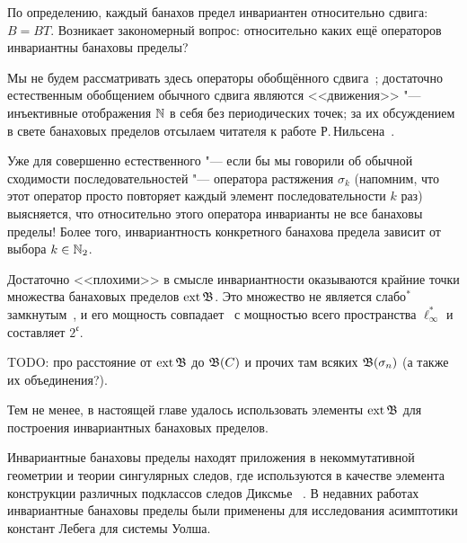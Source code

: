 По определению, каждый банахов предел инвариантен относительно сдвига: $B=BT$.
Возникает закономерный вопрос: относительно каких ещё операторов инвариантны банаховы пределы?

Мы не будем рассматривать здесь операторы обобщённого сдвига~\cite{marchenko2006generalized,lewitan1945normed};
достаточно естественным обобщением обычного сдвига являются <<движения>> "--- инъективные отображения $\mathbb{N}$ в себя без периодических точек; за их обсуждением в свете банаховых пределов отсылаем читателя к работе Р.\,Нильсена~\cite{Nillsen}.

Уже для совершенно естественного "--- если бы мы говорили об обычной сходимости последовательностей "---
оператора растяжения $\sigma_k$
(напомним, что этот оператор просто повторяет каждый элемент последовательности $k$ раз)
выясняется, что относительно этого оператора инварианты не все банаховы пределы!
Более того, инвариантность конкретного банахова предела зависит от выбора $k\in\mathbb{N}_2$.




Достаточно <<плохими>> в смысле инвариантности оказываются крайние точки множества банаховых пределов $\operatorname{ext} \mathfrak{B}$.
Это множество не является слабо$^*$ замкнутым~\cite{Nillsen,Talagrand},
и его мощность совпадает~\cite{Chou} с мощностью всего пространства $\ell_\infty^*$
и составляет $2^{\mathfrak c}$.

TODO: про расстояние от $\operatorname{ext} \mathfrak{B}$ до $\mathfrak{B}(C)$ и прочих там всяких $\mathfrak{B}(\sigma_n)$ (а также их объединения?).

Тем не менее, в настоящей главе удалось использовать элементы $\operatorname{ext}\mathfrak{B}$ для построения инвариантных банаховых пределов.


Инвариантные банаховы пределы находят приложения в некоммутативной геометрии
и теории сингулярных следов, где используются в качестве элемента конструкции
различных подклассов следов Диксмье
~\cite{carey2003spectral,lord2012singular,sukochev2015characterization,sukochev2016dixmier}.
В недавних работах~\cite{astashkin2015constants_rus_DAN,astashkin2016constants_rus_SMJ} инвариантные банаховы пределы были применены для исследования
асимптотики констант Лебега для системы Уолша.

